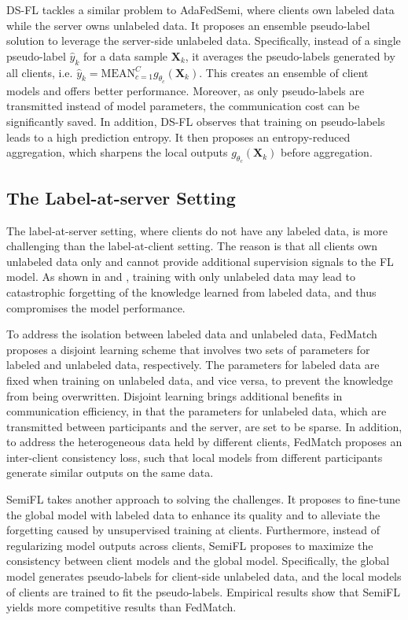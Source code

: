 \documentclass[11pt]{article}
\begin{document}
DS-FL \cite{Yilun-itahara2021distillation} tackles a similar problem to AdaFedSemi, where clients own labeled data while the server owns unlabeled data. It proposes an ensemble pseudo-label solution to leverage the server-side unlabeled data. Specifically, instead of a single pseudo-label $\hat{y}_k$ for a data sample $\mathbf{X}_k$, it averages the pseudo-labels generated by all clients, i.e. $\hat{y}_k=\mathrm{MEAN}_{c=1}^C g_{\theta_c}(\mathbf{X}_k)$. This creates an ensemble of client models and offers better performance. Moreover, as only pseudo-labels are transmitted instead of model parameters, the communication cost can be significantly saved. In addition, DS-FL observes that training on pseudo-labels leads to a high prediction entropy. It then proposes an entropy-reduced aggregation, which sharpens the local outputs $g_{\theta_c}(\mathbf{X}_k)$ before aggregation.

\subsection{The Label-at-server Setting}
The label-at-server setting, where clients do not have any labeled data, is more challenging than the label-at-client setting. The reason is that all clients own unlabeled data only and cannot provide additional supervision signals to the FL model. As shown in \cite{Yilun-jeong2021federated} and \cite{Yilun-diao2022semifl}, training with only unlabeled data may lead to catastrophic forgetting of the knowledge learned from labeled data, and thus compromises the model performance.

To address the isolation between labeled data and unlabeled data, FedMatch \cite{Yilun-jeong2021federated} proposes a disjoint learning scheme that involves two sets of parameters for labeled and unlabeled data, respectively. The parameters for labeled data are fixed when training on unlabeled data, and vice versa, to prevent the knowledge from being overwritten. Disjoint learning brings additional benefits in communication efficiency, in that the parameters for unlabeled data, which are transmitted between participants and the server, are set to be sparse. In addition, to address the heterogeneous data held by different clients, FedMatch proposes an inter-client consistency loss, such that local models from different participants generate similar outputs on the same data.

SemiFL \cite{Yilun-diao2022semifl} takes another approach to solving the challenges. It proposes to fine-tune the global model with labeled data to enhance its quality and to alleviate the forgetting caused by unsupervised training at clients. Furthermore, instead of regularizing model outputs across clients, SemiFL proposes to maximize the consistency between client models and the global model. Specifically, the global model generates pseudo-labels for client-side unlabeled data, and the local models of clients are trained to fit the pseudo-labels. Empirical results show that SemiFL yields more competitive results than FedMatch.
\end{document}
